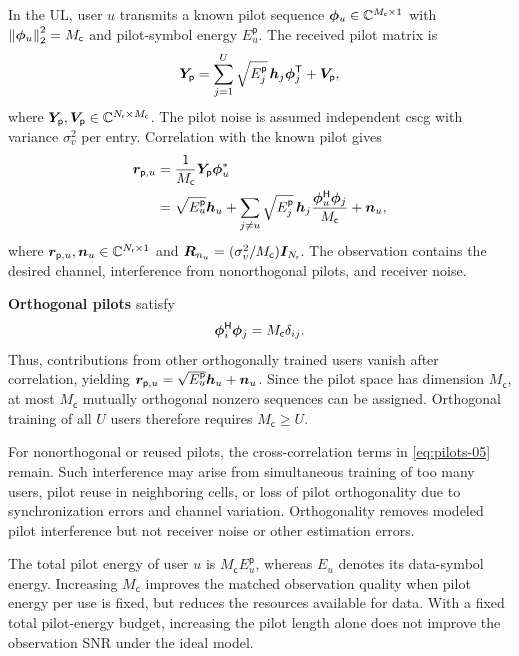 In the UL, user $u$ transmits a known pilot sequence $\bm{\phi}_u\in\mathbb{C}^{M_{\mathsf c}\times1}$ with $\left\|\bm{\phi}_u\right\|_2^2=M_{\mathsf c}$ and pilot-symbol energy $E_u^{\mathsf p}$. The received pilot matrix is
\begin{equation}
	\bm{Y}_{\mathsf p}
	=\sum_{j=1}^{U}\sqrt{E_j^{\mathsf p}}\,
	\bm{h}_j{\bm{\phi}}^{\mathsf{T}}_j+\bm{V}_{\mathsf p},
	\label{eq:pilotmodel-05}
\end{equation}
where $\bm{Y}_{\mathsf p},\bm{V}_{\mathsf p}\in\mathbb{C}^{N_{\mathsf{r}}\times M_{\mathsf c}}$. The pilot noise is assumed independent \ac{cscg} with variance $\sigma_v^2$ per entry. Correlation with the known pilot gives
\begin{equation}
	\begin{split}
		\bm{r}_{\mathsf p,u}
		&=\frac{1}{M_{\mathsf c}}\bm{Y}_{\mathsf p}{\bm{\phi}}^{*}_u\\
		&=\sqrt{E_u^{\mathsf p}}\bm{h}_u
		+\sum_{j\ne u}\sqrt{E_j^{\mathsf p}}\,
		\bm{h}_j\frac{{\bm{\phi}}^{\mathsf{H}}_u\bm{\phi}_j}{M_{\mathsf c}}
		+\bm{n}_u,
	\end{split}
	\label{eq:pilots-05}
\end{equation}
where $\bm{r}_{\mathsf p,u},\bm{n}_u\in\mathbb{C}^{N_{\mathsf{r}}\times1}$ and $\bm{R}_{n_u}=(\sigma_v^2/M_{\mathsf c})\bm{I}_{N_{\mathsf{r}}}$. The observation contains the desired channel, interference from nonorthogonal pilots, and receiver noise.

\textbf{Orthogonal pilots} satisfy
\begin{equation}
	{\bm{\phi}}^{\mathsf{H}}_i\bm{\phi}_j=M_{\mathsf c}\delta_{ij}.
	\label{eq:pilotorth-05}
\end{equation}
Thus, contributions from other orthogonally trained users vanish after correlation, yielding $\bm{r}_{\mathsf p,u}=\sqrt{E_u^{\mathsf p}}\bm{h}_u+\bm{n}_u$. Since the pilot space has dimension $M_{\mathsf c}$, at most $M_{\mathsf c}$ mutually orthogonal nonzero sequences can be assigned. Orthogonal training of all $U$ users therefore requires $M_{\mathsf c}\geq U$.

For nonorthogonal or reused pilots, the cross-correlation terms in \eqref{eq:pilots-05} remain. Such interference may arise from simultaneous training of too many users, pilot reuse in neighboring cells, or loss of pilot orthogonality due to synchronization errors and channel variation. Orthogonality removes modeled pilot interference but not receiver noise or other estimation errors.

The total pilot energy of user $u$ is $M_{\mathsf c}E_u^{\mathsf p}$, whereas $E_u$ denotes its data-symbol energy. Increasing $M_{\mathsf c}$ improves the matched observation quality when pilot energy per use is fixed, but reduces the resources available for data. With a fixed total pilot-energy budget, increasing the pilot length alone does not improve the observation SNR under the ideal model.

